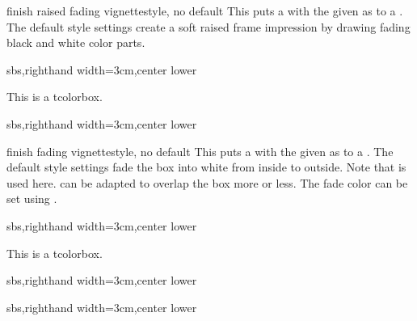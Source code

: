 \begin{docTcbKey}[][doc new=2016-04-22]{finish raised fading vignette}{}{style, no default}
  This puts a  with the given 
  as  to a .
  The default style settings create a soft raised frame impression by
  drawing fading black and white color parts.

\begin{dispExample*}{sbs,righthand width=3cm,center lower}
\begin{tcolorbox}[enhanced,size=small,
  colback=green!10,colframe=green!50!black,
  boxrule=0.5mm,titlerule=0mm,
  title=My title,center title,fonttitle=\bfseries,
  finish raised fading vignette={size=1mm}]
    This is a tcolorbox.
\end{tcolorbox}
\end{dispExample*}

\begin{dispExample*}{sbs,righthand width=3cm,center lower}
\end{dispExample*}

\end{docTcbKey}


\clearpage
\begin{docTcbKey}[][doc new=2016-04-22]{finish fading vignette}{}{style, no default}
  This puts a  with the given 
  as  to a .
  The default style settings fade the box into white from inside to outside.
  Note that  is used here.
   can be adapted to overlap the box
  more or less. The fade color can be set using
  .

\begin{dispExample*}{sbs,righthand width=3cm,center lower}
\begin{tcolorbox}[enhanced,size=small,
  colback=green!10,colframe=green!50!black,
  boxrule=0.5mm,titlerule=0mm,
  title=My title,center title,fonttitle=\bfseries,
  finish fading vignette={size=2mm}]
    This is a tcolorbox.
\end{tcolorbox}
\end{dispExample*}

\begin{dispExample*}{sbs,righthand width=3cm,center lower}
\end{dispExample*}

\begin{dispExample*}{sbs,righthand width=3cm,center lower}
\begin{tcolorbox}[colback=blue!50!black,size=small,
  title=Example]
\end{tcolorbox}
\end{dispExample*}

\end{docTcbKey}


